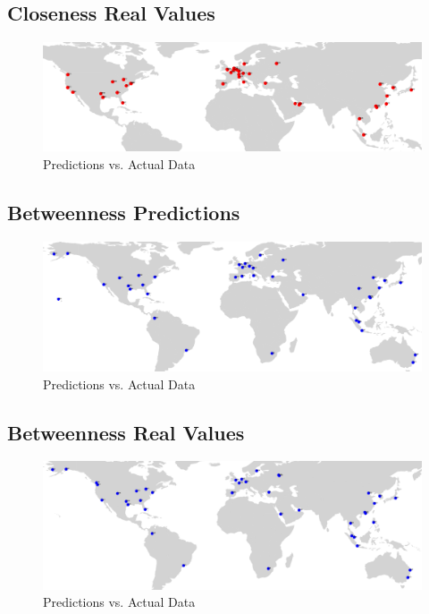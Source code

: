 \documentclass[12pt]{article}
\begin{document}
\subsection*{Closeness Real Values}
\begin{figure}[h!]
	\centering
	\includegraphics[width=1\textwidth]{figures/c.png}
	\caption{Predictions vs. Actual Data}
	\label{fig:closeness}
\end{figure}

\newpage
\subsection*{Betweenness Predictions}
\begin{figure}[h!]
	\centering
	\includegraphics[width=1\textwidth]{figures/b_pred.png}
	\caption{Predictions vs. Actual Data}
	\label{fig:betweennesspredictions}
\end{figure}

\subsection*{Betweenness Real Values}
\begin{figure}[h!]
	\centering
	\includegraphics[width=1\textwidth]{figures/b.png}
	\caption{Predictions vs. Actual Data}
	\label{fig:betweenness}
\end{figure}
\end{document}
